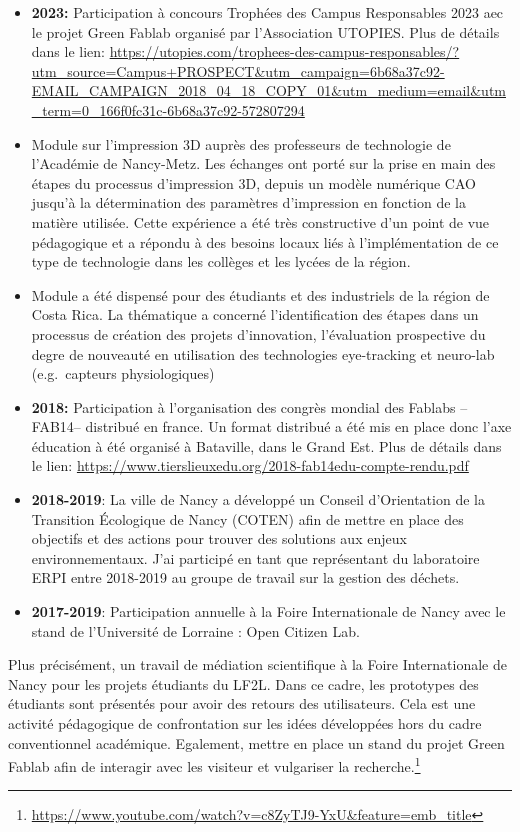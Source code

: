 \documentclass[
  11pt,
]{article}
\begin{document}
\begin{itemize}
\item
  \textbf{2023:} Participation à concours Trophées des Campus
  Responsables 2023 aec le projet Green Fablab organisé par
  l'Association UTOPIES. Plus de détails dans le lien:
  \url{https://utopies.com/trophees-des-campus-responsables/?utm_source=Campus+PROSPECT&utm_campaign=6b68a37c92-EMAIL_CAMPAIGN_2018_04_18_COPY_01&utm_medium=email&utm_term=0_166f0fc31c-6b68a37c92-572807294}
\item
  Module sur l'impression 3D auprès des professeurs de technologie de
  l'Académie de Nancy-Metz. Les échanges ont porté sur la prise en main
  des étapes du processus d'impression 3D, depuis un modèle numérique
  CAO jusqu'à la détermination des paramètres d'impression en fonction
  de la matière utilisée. Cette expérience a été très constructive d'un
  point de vue pédagogique et a répondu à des besoins locaux liés à
  l'implémentation de ce type de technologie dans les collèges et les
  lycées de la région.
\item
  Module a été dispensé pour des étudiants et des industriels de la
  région de Costa Rica. La thématique a concerné l'identification des
  étapes dans un processus de création des projets d'innovation,
  l'évaluation prospective du degre de nouveauté en utilisation des
  technologies eye-tracking et neuro-lab (e.g.~capteurs physiologiques)
\item
  \textbf{2018:} Participation à l'organisation des congrès mondial des
  Fablabs --FAB14-- distribué en france. Un format distribué a été mis
  en place donc l'axe éducation à été organisé à Bataville, dans le
  Grand Est. Plus de détails dans le lien:
  \url{https://www.tierslieuxedu.org/2018-fab14edu-compte-rendu.pdf}
\item
  \textbf{2018-2019}: La ville de Nancy a développé un Conseil
  d'Orientation de la Transition Écologique de Nancy (COTEN) afin de
  mettre en place des objectifs et des actions pour trouver des
  solutions aux enjeux environnementaux. J'ai participé en tant que
  représentant du laboratoire ERPI entre 2018-2019 au groupe de travail
  sur la gestion des déchets.
\item
  \textbf{2017-2019}: Participation annuelle à la Foire Internationale
  de Nancy avec le stand de l'Université de Lorraine : Open Citizen Lab.
\end{itemize}

Plus précisément, un travail de médiation scientifique à la Foire
Internationale de Nancy pour les projets étudiants du LF2L. Dans ce
cadre, les prototypes des étudiants sont présentés pour avoir des
retours des utilisateurs. Cela est une activité pédagogique de
confrontation sur les idées développées hors du cadre conventionnel
académique. Egalement, mettre en place un stand du projet Green Fablab
afin de interagir avec les visiteur et vulgariser la
recherche.\footnote{\url{https://www.youtube.com/watch?v=c8ZyTJ9-YxU&feature=emb_title}}
\end{document}

